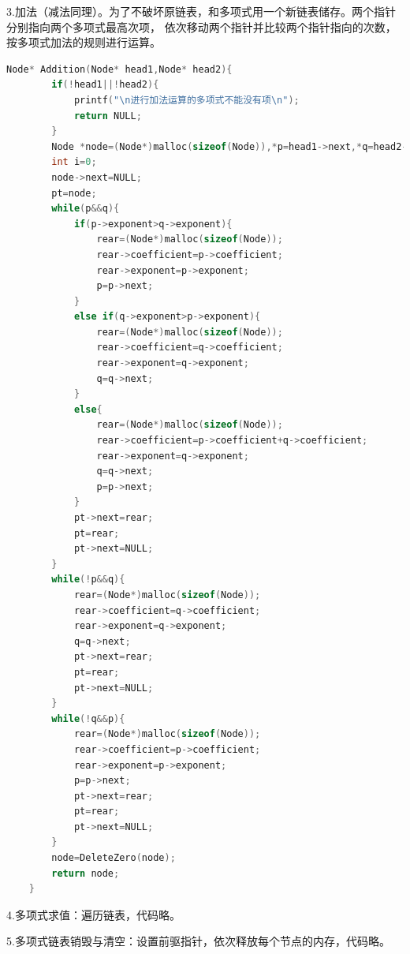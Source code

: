 \documentclass{ctexart}
\begin{document}
	3.加法（减法同理）。为了不破坏原链表，和多项式用一个新链表储存。两个指针分别指向两个多项式最高次项，
	依次移动两个指针并比较两个指针指向的次数，按多项式加法的规则进行运算。
	\begin{lstlisting}[language=C, caption=加法]
	Node* Addition(Node* head1,Node* head2){
		if(!head1||!head2){
			printf("\n进行加法运算的多项式不能没有项\n");
			return NULL;
		}
		Node *node=(Node*)malloc(sizeof(Node)),*p=head1->next,*q=head2->next,*rear=NULL,*pt=NULL;
		int i=0;
		node->next=NULL;
		pt=node;
		while(p&&q){
			if(p->exponent>q->exponent){
				rear=(Node*)malloc(sizeof(Node));
				rear->coefficient=p->coefficient;
				rear->exponent=p->exponent;
				p=p->next;
			}
			else if(q->exponent>p->exponent){
				rear=(Node*)malloc(sizeof(Node));
				rear->coefficient=q->coefficient;
				rear->exponent=q->exponent;
				q=q->next;
			}
			else{
				rear=(Node*)malloc(sizeof(Node));
				rear->coefficient=p->coefficient+q->coefficient;
				rear->exponent=q->exponent;
				q=q->next;
				p=p->next;
			}
			pt->next=rear;
			pt=rear;
			pt->next=NULL;
		}
		while(!p&&q){
			rear=(Node*)malloc(sizeof(Node));
			rear->coefficient=q->coefficient;
			rear->exponent=q->exponent;
			q=q->next;
			pt->next=rear;
			pt=rear;
			pt->next=NULL;
		}
		while(!q&&p){
			rear=(Node*)malloc(sizeof(Node));
			rear->coefficient=p->coefficient;
			rear->exponent=p->exponent;
			p=p->next;
			pt->next=rear;
			pt=rear;
			pt->next=NULL;
		}
		node=DeleteZero(node);
		return node;
	}
	\end{lstlisting}

	4.多项式求值：遍历链表，代码略。

	5.多项式链表销毁与清空：设置前驱指针，依次释放每个节点的内存，代码略。
\end{document}
